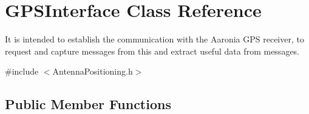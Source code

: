 \hypertarget{classGPSInterface}{}\section{G\+P\+S\+Interface Class Reference}
\label{classGPSInterface}


It is intended to establish the communication with the Aaronia G\+PS receiver, to request and capture messages from this and extract useful data from messages.  




{\ttfamily \#include $<$Antenna\+Positioning.\+h$>$}

\subsection*{Public Member Functions}
